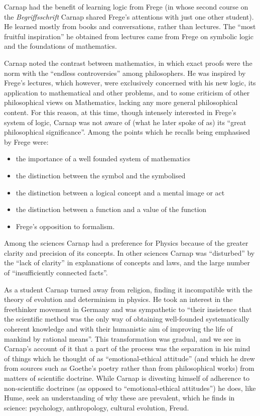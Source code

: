\documentclass[10pt,titlepage]{book}
\begin{document}
Carnap had the benefit of learning logic from Frege (in whose second course on the {\it Begriffsschrift} Carnap shared Frege's attentions with just one other student).
He learned mostly from books and conversations, rather than lectures.
The ``most fruitful inspiration'' he obtained from lectures came from Frege on symbolic logic and the foundations of mathematics.

Carnap noted the contrast between mathematics, in which exact proofs were the norm with the ``endless controversies'' among philosophers. 
He was inspired by Frege's lectures, which however, were exclusively concerned with his new logic, its application to mathematical and other problems, and to some criticism of other philosophical views on Mathematics, lacking any more general philosophical content.
For this reason, at this time, though intensely interested in Frege's system of logic, Carnap was not aware of (what he later spoke of as) its ``great philosophical significance''.
Among the points which he recalls being emphasised by Frege were:
\begin{itemize}
\item the importance of a well founded system of mathematics
\item the distinction between the symbol and the symbolised
\item the distinction between a logical concept and a mental image or act
\item the distinction between a function and a value of the function
\item Frege's opposition to formalism.
\end{itemize}

Among the sciences Carnap had a preference for Physics because of the greater clarity and precision of its concepts.
In other sciences Carnap was ``disturbed'' by the ``lack of clarity'' in explanations of concepts and laws, and the large number of ``insufficiently connected facts''.

As a student Carnap turned away from religion, finding it incompatible with the theory of evolution and determinism in physics.
He took an interest in the freethinker movement in Germany and was sympathetic to ``their insistence that the scientific method was the only way of obtaining well-founded systematically coherent knowledge and with their humanistic aim of improving the life of mankind by rational means''.
This transformation was gradual, and we see in Carnap's account of it that a part of the process was the separation in his mind of things which he thought of as ``emotional-ethical attitude'' (and which he drew from sources such as Goethe's poetry rather than from philosophical works) from matters of scientific doctrine.
While Carnap is divesting himself of adherence to non-scientific doctrines (as opposed to ``emotional-ethical attitudes'') he does, like Hume, seek an understanding of why these are prevalent, which he finds in science: psychology, anthropology, cultural evolution, Freud.
\end{document}
